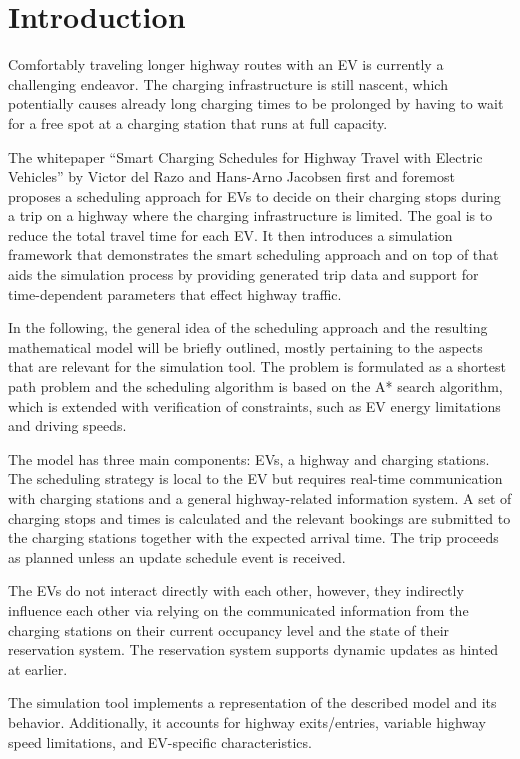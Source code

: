 \section{Introduction}

Comfortably traveling longer highway routes with an EV is currently a challenging endeavor. The charging
infrastructure is still nascent, which potentially causes already long charging times to be prolonged by having to
wait for a free spot at a charging station that runs at full capacity.

The whitepaper ``Smart Charging Schedules for Highway Travel with Electric Vehicles'' \cite{driver-17} by Victor del Razo and
Hans-Arno Jacobsen first and foremost proposes a scheduling approach for EVs to decide on their charging stops during
a trip on a highway where the charging infrastructure is limited. The goal is to reduce the total travel time for
each EV. It then introduces a simulation framework that demonstrates the smart scheduling approach and on top of that
aids the simulation process by providing generated trip data and support for time-dependent parameters that effect
highway traffic.

In the following, the general idea of the scheduling approach and the resulting mathematical model will be briefly
outlined, mostly pertaining to the aspects that are relevant for the simulation tool. The problem is formulated as a
shortest path problem and the scheduling algorithm is based on the A* search algorithm, which is extended with
verification of constraints, such as EV energy limitations and driving speeds.

The model has three main components: EVs, a highway and charging stations. The scheduling strategy is local to the EV
but requires real-time communication with charging stations and a general highway-related information system. A set
of charging stops and times is calculated and the relevant bookings are submitted to the charging stations together
with the expected arrival time. The trip proceeds as planned unless an update schedule event is received.

The EVs do not interact directly with each other, however, they indirectly influence each other via relying on the
communicated information from the charging stations on their current occupancy level and the state of their reservation
system. The reservation system supports dynamic updates as hinted at earlier.

The simulation tool implements a representation of the described model and its behavior. Additionally, it accounts for
highway exits/entries, variable highway speed limitations, and EV-specific characteristics.

